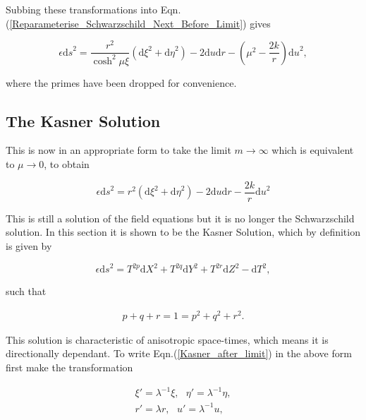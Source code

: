 \noindent Subbing these transformations into Eqn.(\ref{Reparameterise_Schwarzschild_Next_Before_Limit}) gives

\begin{equation*}
\epsilon {\mathrm{d}s}^2 = \frac{r^2}{\cosh^{2}{\mu \xi}} ({\mathrm{d}\xi}^2 + {\mathrm{d}\eta}^2) - 2 {\mathrm{d}u}{\mathrm{d}r} - \left( \mu^{2} - \frac{2k}{r} \right) {\mathrm{d}u}^2,
\end{equation*}

\noindent where the primes have been dropped for convenience. 

\subsection{The Kasner Solution}

This is now in an appropriate form to take the limit $m \rightarrow \infty$ which is equivalent to $\mu \rightarrow 0$, to obtain

\begin{equation}\label{Kasner_after_limit}
\epsilon {\mathrm{d}s}^2 = r^2 ({\mathrm{d}\xi}^2 + {\mathrm{d}\eta}^2) - 2 {\mathrm{d}u}{\mathrm{d}r} - \frac{2k}{r} {\mathrm{d}u}^2
\end{equation}

\noindent This is still a solution of the field equations but it is no longer the Schwarzschild solution. In this section it is shown to be the Kasner Solution, which by definition is given by

\begin{equation}\label{Reparameterise_Definition_Of_Kasner} 
\epsilon {\mathrm{d}s}^2 = T^{2p} {\mathrm{d}X}^2 + T^{2q} \mathrm{d}Y^2 + T^{2r} \mathrm{d}Z^2 - \mathrm{d}T^2,
\end{equation}

\noindent such that

\begin{eqnarray*}
p + q + r = 1 = p^2 + q^2 + r^2.
\end{eqnarray*}

This solution is characteristic of anisotropic space-times, which means it is directionally dependant. To write Eqn.(\ref{Kasner_after_limit}) in the above form first make the transformation

\begin{gather*} 
\xi' = \lambda^{-1} \xi, \text{    }  \eta' = \lambda^{-1} \eta, \\
r' = \lambda r,          \text{    }  u' = \lambda^{-1} u,
\end{gather*}

